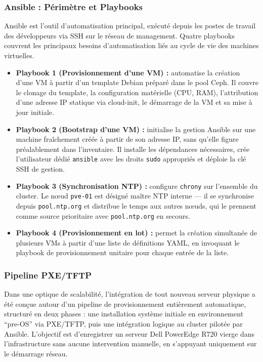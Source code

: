 \subsubsection{Ansible : Périmètre et Playbooks}

\par Ansible est l'outil d'automatisation principal, exécuté depuis les postes de travail des développeurs via SSH sur le réseau de management. Quatre playbooks couvrent les principaux besoins d'automatisation liés au cycle de vie des machines virtuelles.\\

\begin{itemize}
    \item \textbf{Playbook 1 (Provisionnement d'une VM) :} automatise la création d'une VM à partir d'un template Debian préparé dans le pool Ceph. Il couvre le clonage du template, la configuration matérielle (CPU, RAM), l'attribution d'une adresse IP statique via cloud-init, le démarrage de la VM et sa mise à jour initiale.

    \item \textbf{Playbook 2 (Bootstrap d'une VM) :} initialise la gestion Ansible sur une machine fraîchement créée à partir de son adresse IP, sans qu'elle figure préalablement dans l'inventaire. Il installe les dépendances nécessaires, crée l'utilisateur dédié \texttt{ansible} avec les droits \texttt{sudo} appropriés et déploie la clé SSH de gestion.

    \item \textbf{Playbook 3 (Synchronisation NTP) :} configure \texttt{chrony} sur l'ensemble du cluster. Le nœud \texttt{pve-01} est désigné maître NTP interne — il se synchronise depuis \texttt{pool.ntp.org} et distribue le temps aux autres nœuds, qui le prennent comme source prioritaire avec \texttt{pool.ntp.org} en secours.

    \item \textbf{Playbook 4 (Provisionnement en lot) :} permet la création simultanée de plusieurs VMs à partir d'une liste de définitions YAML, en invoquant le playbook de provisionnement unitaire pour chaque entrée de la liste. \end{itemize}

\subsubsection{Pipeline PXE/TFTP}

\par Dans une optique de scalabilité, l'intégration de tout nouveau serveur physique a été conçue autour d'un pipeline de provisionnement entièrement automatique, structuré en deux phases : une installation système initiale en environnement ``pre-OS'' via PXE/TFTP, puis une intégration logique au cluster pilotée par Ansible. L'objectif est d'enregistrer un serveur Dell PowerEdge R720 vierge dans l'infrastructure sans aucune intervention manuelle, en s'appuyant uniquement sur le démarrage réseau.\\

